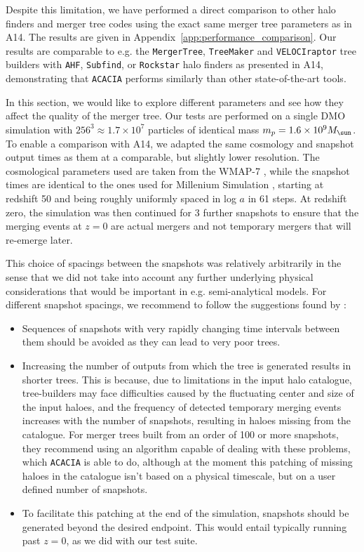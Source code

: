 Despite this limitation, we have performed a direct comparison to
other halo finders and merger tree codes using the exact same merger
tree parameters as in A14. The results are
given in Appendix~\ref{app:performance_comparison}.  Our results are
comparable to e.g. the \texttt{MergerTree}, \texttt{TreeMaker} and 
\texttt{VELOCIraptor} tree builders with \texttt{AHF}, \texttt{Subfind},
or \texttt{Rockstar} halo finders as presented in A14, demonstrating that
\texttt{ACACIA} performs similarly than other state-of-the-art tools.


In this section, we would like to explore different parameters and see
how they affect the quality of the merger tree.  Our tests are
performed on a single DMO simulation with $256^3 \approx 1.7\times
10^7$ particles of identical mass $m_p = 1.6\times 10^9\msol$. To enable
a comparison with A14, we adapted the same cosmology
and snapshot output times as them at a comparable, but slightly lower
resolution. The cosmological parameters used are taken from the WMAP-7 
\citep{komatsuSevenYearWilkinsonMicrowave2011}, while the snapshot times 
are identical to the ones used for Millenium Simulation 
\citep{springelSimulationsFormationEvolution2005a}, starting at redshift
50 and being roughly uniformly spaced in log $a$ in 61 steps. 
At redshift zero, the simulation was then continued for 3 further snapshots 
to ensure that the merging events at $z = 0$ are actual mergers and not 
temporary mergers that will re-emerge later.

This choice of spacings between the snapshots was relatively
arbitrarily in the sense that we did not take into account any further
underlying physical considerations that would be important in e.g.
semi-analytical models. For different snapshot spacings, we recommend to 
follow the suggestions found by \citet{SUSSING_CONVERGENCE}:

\begin{itemize}
\item  Sequences of snapshots with very rapidly changing time intervals 
between them should be avoided as they can lead to very poor trees.
\item  Increasing the number of outputs from which the tree is generated 
results in shorter trees. This is because, due to limitations in the input halo 
catalogue, tree-builders may face difficulties caused by the fluctuating center 
and size of the input haloes, and the frequency of detected temporary merging 
events increases with the number of snapshots, resulting in haloes missing from
the catalogue. For merger trees built from
an order of 100 or more snapshots, they recommend using an algorithm capable of
dealing with these problems, which \texttt{ACACIA} is able to do, although at the
moment this patching of missing haloes in the catalogue isn't based on a physical
timescale, but on a user defined number of snapshots.
\item  To facilitate this patching at the end of the simulation, snapshots should 
be generated beyond the desired endpoint. This would entail typically running past 
$z = 0$, as we did with our test suite. 
\end{itemize}

